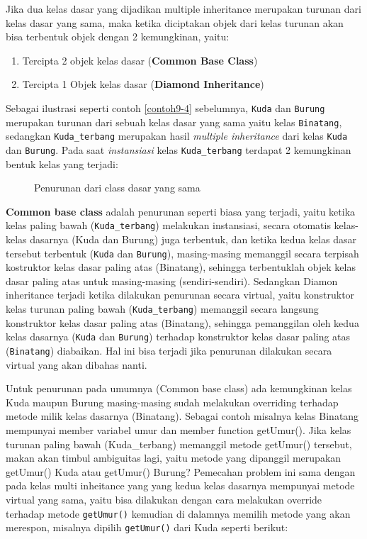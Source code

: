 Jika dua kelas dasar yang dijadikan multiple inheritance merupakan
turunan dari kelas dasar yang sama, maka ketika diciptakan objek dari
kelas turunan akan bisa terbentuk objek dengan 2 kemungkinan, yaitu:

\begin{enumerate}


\item
  Tercipta 2 objek kelas dasar (\textbf{Common Base Class})
\item
  Tercipta 1 Objek kelas dasar (\textbf{Diamond Inheritance})
\end{enumerate}

Sebagai ilustrasi seperti contoh \ref{contoh9-4} sebelumnya, \texttt{Kuda} dan
\texttt{Burung} merupakan turunan dari sebuah kelas dasar yang sama
yaitu kelas \texttt{Binatang}, sedangkan \texttt{Kuda\_terbang}
merupakan hasil \emph{multiple inheritance} dari kelas \texttt{Kuda} dan
\texttt{Burung}. Pada saat \emph{instansiasi} kelas
\texttt{Kuda\_terbang} terdapat 2 kemungkinan bentuk kelas yang terjadi:

\begin{figure}[htbp]
\centering
{}
\caption{Penurunan dari class dasar yang sama}
\end{figure}

\textbf{Common base class} adalah penurunan seperti biasa yang terjadi,
yaitu ketika kelas paling bawah (\texttt{Kuda\_terbang}) melakukan
instansiasi, secara otomatis kelas-kelas dasarnya (Kuda dan Burung) juga
terbentuk, dan ketika kedua kelas dasar tersebut terbentuk
(\texttt{Kuda} dan \texttt{Burung}), masing-masing memanggil secara
terpisah kostruktor kelas dasar paling atas (Binatang), sehingga
terbentuklah objek kelas dasar paling atas untuk masing-masing
(sendiri-sendiri). Sedangkan Diamon inheritance terjadi ketika dilakukan
penurunan secara virtual, yaitu konstruktor kelas turunan paling bawah
(\texttt{Kuda\_terbang}) memanggil secara langsung konstruktor kelas
dasar paling atas (Binatang), sehingga pemanggilan oleh kedua kelas
dasarnya (\texttt{Kuda} dan \texttt{Burung}) terhadap konstruktor kelas
dasar paling atas (\texttt{Binatang}) diabaikan. Hal ini bisa terjadi
jika penurunan dilakukan secara virtual yang akan dibahas nanti.

Untuk penurunan pada umumnya (Common base class) ada kemungkinan kelas
Kuda maupun Burung masing-masing sudah melakukan overriding terhadap
metode milik kelas dasarnya (Binatang). Sebagai contoh misalnya kelas
Binatang mempunyai member variabel umur dan member function getUmur().
Jika kelas turunan paling bawah (Kuda\_terbang) memanggil metode
getUmur() tersebut, makan akan timbul ambiguitas lagi, yaitu metode yang
dipanggil merupakan getUmur() Kuda atau getUmur() Burung? Pemecahan
problem ini sama dengan pada kelas multi inheitance yang yang kedua
kelas dasarnya mempunyai metode virtual yang sama, yaitu bisa dilakukan
dengan cara melakukan override terhadap metode \texttt{getUmur()} kemudian di
dalamnya memilih metode yang akan merespon, misalnya dipilih \texttt{getUmur()}
dari Kuda seperti berikut:

